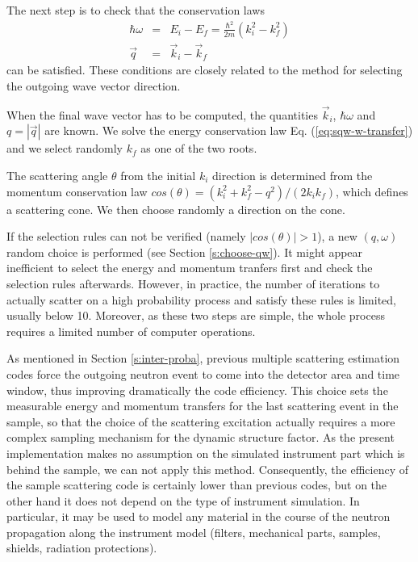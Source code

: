 The next step is to check that the conservation laws
\begin{eqnarray}
\hbar \omega &=& E_i - E_f = \frac{\hbar^2}{2m}(k_i^2 - k_f^2) \label{eq:sqw-w-transfer} \\
\vec q &=& \vec k_i - \vec k_f \label{eq:sqw-q-transfer}
\end{eqnarray}
can be satisfied. These conditions are closely related to the method for selecting the outgoing wave vector direction.

When the final wave vector has to be computed, the quantities $\vec{k}_i$, $\hbar \omega$ and $q = |\vec{q}|$ are known.
We solve the energy conservation law Eq. (\ref{eq:sqw-w-transfer}) and we select randomly $k_f$ as one of the two roots.

The scattering angle $\theta$ from the initial $k_i$ direction is determined from the momentum conservation law $cos(\theta) = (k_i^2 + k_f^2 - q^2)/(2k_i k_f)$, which defines a scattering cone. We then choose randomly a direction on the cone.

If the selection rules can not be verified (namely $|cos(\theta)| > 1$), a new $(q,\omega)$ random choice is performed (see Section \ref{s:choose-qw}).
It might appear inefficient to select the energy and momentum tranfers first and check the selection rules afterwards. However, in practice, the number of iterations to actually scatter on a high probability process and satisfy these rules is limited, usually below 10. Moreover, as these two steps are simple, the whole process requires a limited number of computer operations.

As mentioned in Section \ref{s:inter-proba}, previous multiple scattering estimation codes \cite{msc,mscat,discus} force the outgoing neutron event to come into the detector area and time window, thus improving dramatically the code efficiency. This choice sets the measurable energy and momentum transfers for the last scattering event in the sample, so that the choice of the scattering excitation actually requires a more complex sampling mechanism for the dynamic structure factor. As the present implementation makes no assumption on the simulated instrument part which is behind the sample, we can not apply this method. Consequently, the efficiency of the sample scattering code is certainly lower than previous codes, but on the other hand it does not depend on the type of instrument simulation. In particular, it may be used to model any material in the course of the neutron propagation along the instrument model (filters, mechanical parts, samples, shields, radiation protections).

